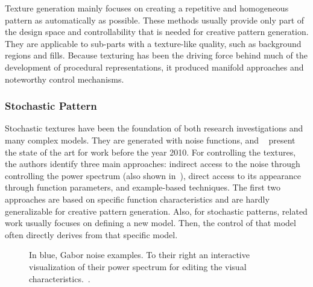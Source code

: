  Texture generation mainly focuses on creating a repetitive and homogeneous pattern as automatically as possible. These methods usually provide only part of the design space and controllability that is needed for creative pattern generation. They are applicable to sub-parts with a texture-like quality, such as background regions and fills. Because texturing has been the driving force behind much of the development of procedural representations, it produced manifold approaches and noteworthy control mechanisms. 

\subsubsection{Stochastic Pattern}
\label{subsubsec:analysis_distribution_and_repetition_stochastic}

Stochastic textures have been the foundation of both research investigations and many complex models. They are generated with noise functions, and \citeauthor*{lagae_2010_sap}~\cite{lagae_2010_sap} present the state of the art for work before the year 2010.  For controlling the textures, the authors identify three main approaches: indirect access to the noise through controlling the power spectrum (also shown in~), direct access to its appearance through function parameters, and example-based techniques. The first two approaches are based on specific function characteristics and are hardly generalizable for creative pattern generation. Also, for stochastic patterns, related work usually focuses on defining a new model. Then, the control of that model often directly derives from that specific model.

\begin{figure}[H]
    \centering
    \caption{\label{fig:galerne_2012_gne}In blue, Gabor noise examples. To their right an interactive visualization of their power spectrum for editing the visual characteristics.~\cite{galerne_2012_gne}.}
\end{figure}

